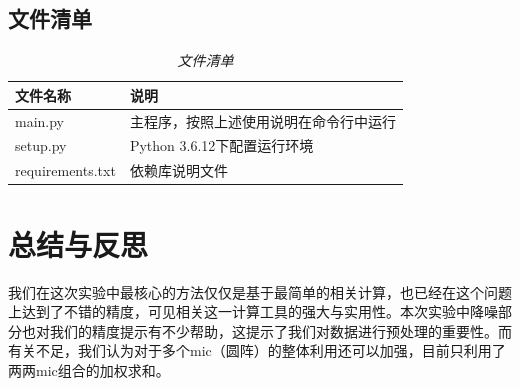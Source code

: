 \documentclass[a4paper]{ctexart}
\begin{document}
\subsection{文件清单}

\begin{table}[h]
    \centering
    \caption{\textit{文件清单}}
    \begin{tabular}{ll}
        \toprule
        文件名称         & 说明                       \\
        \midrule
        main.py          & 主程序，按照上述使用说明在命令行中运行  \\
        setup.py         & Python 3.6.12下配置运行环境  \\
        requirements.txt & 依赖库说明文件                   \\
        \bottomrule
    \end{tabular}
\end{table}

\section{总结与反思}
我们在这次实验中最核心的方法仅仅是基于最简单的相关计算，也已经在这个问题上达到了不错的精度，可见相关这一计算工具的强大与实用性。本次实验中降噪部分也对我们的精度提示有不少帮助，这提示了我们对数据进行预处理的重要性。而有关不足，我们认为对于多个mic（圆阵）的整体利用还可以加强，目前只利用了两两mic组合的加权求和。
\end{document}
